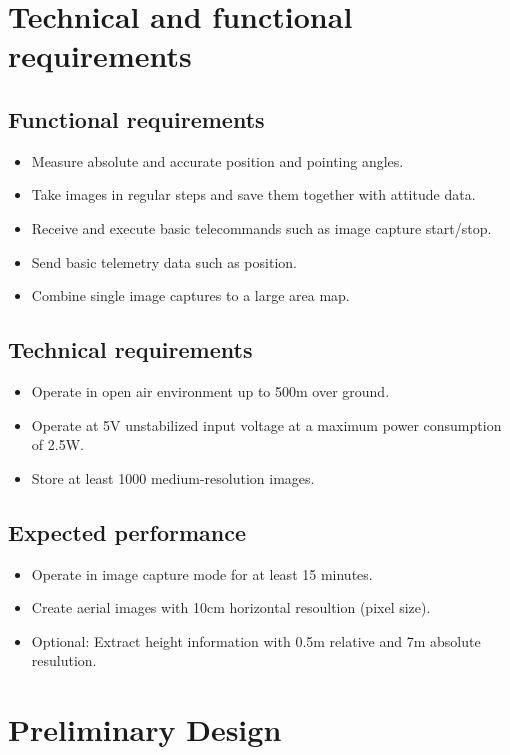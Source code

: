 \documentclass[fontsize=11pt,paper=a4,]{scrartcl}
\begin{document}
\section{Technical and functional requirements}
\subsection{Functional requirements}
\label{sub:Functional_requirements}
\begin{itemize}
\item Measure absolute and accurate position and pointing angles.
\item Take images in regular steps and save them together with attitude data.
\item Receive and execute basic telecommands such as image capture start/stop.
\item Send basic telemetry data such as position.
\item Combine single image captures to a large area map.
\end{itemize}


\subsection{Technical requirements}
\begin{itemize}
\item Operate in open air environment up to 500m over ground.
\item Operate at 5V unstabilized input voltage at a maximum power consumption of 2.5W.
\item Store at least 1000 medium-resolution images.
\end{itemize}


\subsection{Expected performance}
\begin{itemize}
\item Operate in image capture mode for at least 15 minutes.
\item Create aerial images with 10cm horizontal resoultion (pixel size).
\item Optional: Extract height information with 0.5m relative and 7m absolute resulution.
\end{itemize}

\section{Preliminary Design}
\end{document}
